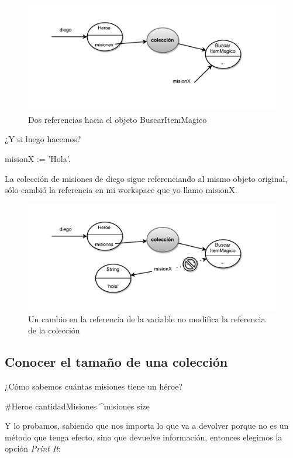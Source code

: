 \documentclass[a4paper,12pt]{book}
\begin{document}
\begin{figure}[h!]
    \centering	
    \includegraphics[width=1\textwidth]{images/30_Referencias_colecciones.pdf}
    \caption{Dos referencias hacia el objeto BuscarItemMagico}
\end{figure}
\FloatBarrier

¿Y si luego hacemos?

\begin{code}
misionX := 'Hola'.
\end{code}

La colección de misiones de diego sigue referenciando al mismo objeto original, sólo cambió la referencia
en mi workspace que yo llamo misionX.

\begin{figure}[h!]
    \centering	
    \includegraphics[width=1\textwidth]{images/31_Referencias_colecciones.pdf}
    \caption{Un cambio en la referencia de la variable no modifica la referencia de la colección}
\end{figure}
\FloatBarrier


\subsection{Conocer el tamaño de una colección}
¿Cómo sabemos cuántas misiones tiene un héroe?

\begin{code}
#Heroe
cantidadMisiones
    ^misiones size
\end{code}
Y lo probamos, sabiendo que nos importa lo que va a devolver porque no es un método que tenga efecto, sino que
devuelve información, entonces elegimos la opción \textit{Print It}:
\end{document}
